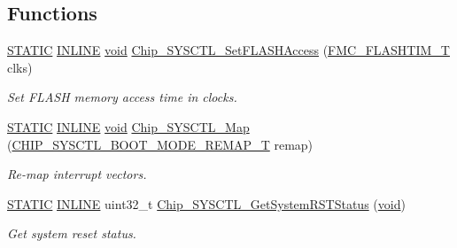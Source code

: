 \subsection*{Functions}
\begin{DoxyCompactItemize}
\item 
\hyperlink{group__LPC__Types__Public__Macros_ga10b2d890d871e1489bb02b7e70d9bdfb}{S\-T\-A\-T\-I\-C} \hyperlink{group__LPC__Types__Public__Types_ga2eb6f9e0395b47b8d5e3eeae4fe0c116}{I\-N\-L\-I\-N\-E} \hyperlink{Paradigm_2Tern__EE_2small_2portmacro_8h_a14d32f8130d3c0b212cfc751730b5b49}{void} \hyperlink{group__SYSCTL__17XX__40XX_gacaea88993f709565eb0166779426b6d8}{Chip\-\_\-\-S\-Y\-S\-C\-T\-L\-\_\-\-Set\-F\-L\-A\-S\-H\-Access} (\hyperlink{group__SYSCTL__17XX__40XX_ga0779e088e3fa7b3a18e66fa0949da8a7}{F\-M\-C\-\_\-\-F\-L\-A\-S\-H\-T\-I\-M\-\_\-\-T} clks)
\begin{DoxyCompactList}\small\item\em Set F\-L\-A\-S\-H memory access time in clocks. \end{DoxyCompactList}\item 
\hyperlink{group__LPC__Types__Public__Macros_ga10b2d890d871e1489bb02b7e70d9bdfb}{S\-T\-A\-T\-I\-C} \hyperlink{group__LPC__Types__Public__Types_ga2eb6f9e0395b47b8d5e3eeae4fe0c116}{I\-N\-L\-I\-N\-E} \hyperlink{Paradigm_2Tern__EE_2small_2portmacro_8h_a14d32f8130d3c0b212cfc751730b5b49}{void} \hyperlink{group__SYSCTL__17XX__40XX_gab44b1cefe990081961a517994babfcbd}{Chip\-\_\-\-S\-Y\-S\-C\-T\-L\-\_\-\-Map} (\hyperlink{group__SYSCTL__17XX__40XX_gaacc03dffa90a522f3fc992e9940d196e}{C\-H\-I\-P\-\_\-\-S\-Y\-S\-C\-T\-L\-\_\-\-B\-O\-O\-T\-\_\-\-M\-O\-D\-E\-\_\-\-R\-E\-M\-A\-P\-\_\-\-T} remap)
\begin{DoxyCompactList}\small\item\em Re-\/map interrupt vectors. \end{DoxyCompactList}\item 
\hyperlink{group__LPC__Types__Public__Macros_ga10b2d890d871e1489bb02b7e70d9bdfb}{S\-T\-A\-T\-I\-C} \hyperlink{group__LPC__Types__Public__Types_ga2eb6f9e0395b47b8d5e3eeae4fe0c116}{I\-N\-L\-I\-N\-E} uint32\-\_\-t \hyperlink{group__SYSCTL__17XX__40XX_gadd10c121cb32ddc55dd62e13de780c59}{Chip\-\_\-\-S\-Y\-S\-C\-T\-L\-\_\-\-Get\-System\-R\-S\-T\-Status} (\hyperlink{Paradigm_2Tern__EE_2small_2portmacro_8h_a14d32f8130d3c0b212cfc751730b5b49}{void})
\begin{DoxyCompactList}\small\item\em Get system reset status. \end{DoxyCompactList}\item 

\end{DoxyCompactItemize}
